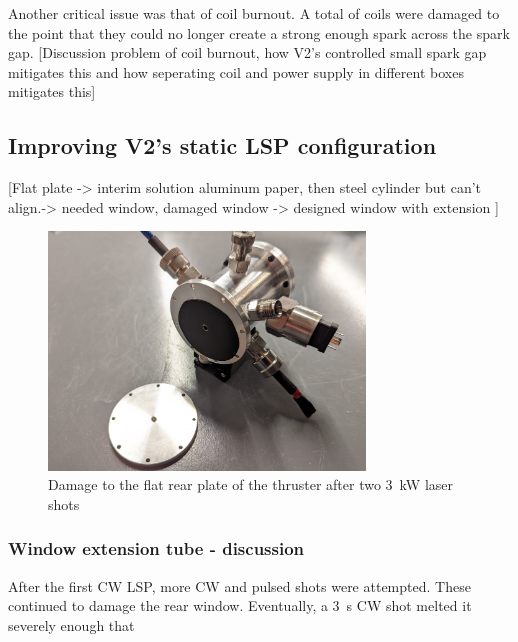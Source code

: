                Another critical issue was that of coil burnout. A total of  coils were damaged to the point that they could no longer create a strong enough spark across the spark gap. [Discussion problem of coil burnout, how V2's controlled small spark gap mitigates this and how seperating coil and power supply in different boxes mitigates this]

    \subsection{Improving V2's static LSP configuration}

        [Flat plate -> interim solution aluminum paper, then steel cylinder but can't align.-> needed window, damaged window -> designed window with extension ]

        \begin{figure}[!ht]
            \centering
            \includegraphics[width=0.75\textwidth]{assets/4 experiments/V2 test damage.jpg}
            \caption{Damage to the flat rear plate of the thruster after two \qty{3}{kW} laser shots}
        \end{figure}

        \subsubsection{Window extension tube - discussion}
        
        After the first CW LSP, more CW and pulsed shots were attempted. These continued to damage the rear window. Eventually, a \qty{3}{s} CW shot melted it severely enough that 

